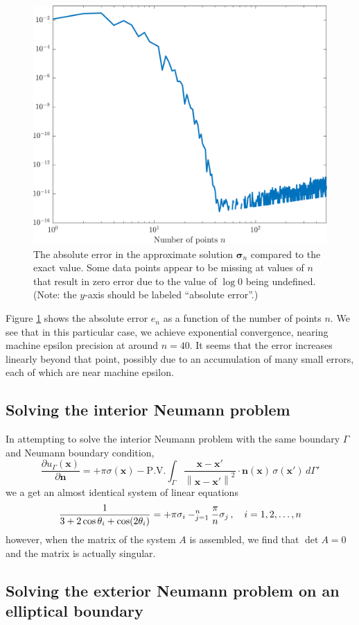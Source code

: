 \documentclass[11pt]{article}
\let\sumop\relax
\newcommand\p[2]{\frac{\partial #1}{\partial #2}}
\newcommand{\norm}[1]{\left\lVert#1\right\rVert}
\begin{document}
\begin{figure}[!htb]
  \centering
  \includegraphics[width=0.9\linewidth]{sigma_error.png}
  \caption{The absolute error in the approximate solution $\bm{\sigma}_n$ compared to the exact value. Some data points appear to be missing at values of $n$ that result in zero error due to the value of $\log 0$ being undefined. (Note: the $y$-axis should be labeled ``absolute error''.)}
  \label{fig:sigma_error}
\end{figure}

Figure \ref{fig:sigma_error} shows the absolute error $e_n$ as a function of the number of points $n$. We see that in this particular case, we achieve exponential convergence, nearing machine epsilon precision at around $n=40$. It seems that the error increases linearly beyond that point, possibly due to an accumulation of many small errors, each of which are near machine epsilon.

\subsection{Solving the interior Neumann problem}
In attempting to solve the interior Neumann problem with the same boundary $\Gamma$ and Neumann boundary condition,
\begin{equation}
\p{u_\Gamma(\bm{x})}{\bm{n}}
= +\pi\sigma(\bm{x}) - \mathrm{P.V.}\int_\Gamma \frac{\bm{x-x'}}{\norm{\bm{x-x'}}^2} \cdot \bm{n}(\bm{x}) \, \sigma(\bm{x}') \, d\Gamma'
\end{equation}
we a get an almost identical system of linear equations
\begin{equation*}
\frac{1}{3 + 2\cos\theta_i + \cos(2\theta_i)}
= +\pi\sigma_i - \sumop_{j=1}^n \frac{\pi}{n} \sigma_j \, , \quad i = 1,2,\dots,n
\end{equation*}
however, when the matrix of the system $A$ is assembled, we find that $\det A = 0$ and the matrix is actually singular. 

\subsection{Solving the exterior Neumann problem on an elliptical boundary}
\end{document}
